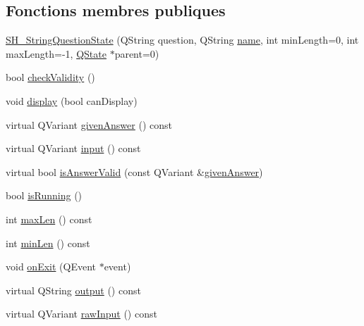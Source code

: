 \subsection*{Fonctions membres publiques}
\begin{DoxyCompactItemize}
\item 
\hyperlink{classSimpleHotel_1_1SH__StringQuestionState_a9c0279dfa4d5839719a3c0380d126f84}{S\-H\-\_\-\-String\-Question\-State} (Q\-String question, Q\-String \hyperlink{classSimpleHotel_1_1SH__NamedObject_ad144716345034c91cface8f3163a799e}{name}, int min\-Length=0, int max\-Length=-\/1, \hyperlink{classQState}{Q\-State} $\ast$parent=0)
\item 
bool \hyperlink{classSimpleHotel_1_1SH__QuestionState_a0fd7e76443cfd6f0329b085358e30355}{check\-Validity} ()
\item 
void \hyperlink{classSimpleHotel_1_1SH__InOutState_a1cbe5befe4f42e0941165498ed0117a9}{display} (bool can\-Display)
\item 
virtual Q\-Variant \hyperlink{classSimpleHotel_1_1SH__QuestionState_a243f09bc1f822af7748edb038ac2957c}{given\-Answer} () const 
\item 
virtual Q\-Variant \hyperlink{classSimpleHotel_1_1SH__InOutState_a487d2ca6200fed372b1a27cfa27774db}{input} () const 
\item 
virtual bool \hyperlink{classSimpleHotel_1_1SH__StringQuestionState_a64428aab057a96918f2f97815c7c2717}{is\-Answer\-Valid} (const Q\-Variant \&\hyperlink{classSimpleHotel_1_1SH__QuestionState_a243f09bc1f822af7748edb038ac2957c}{given\-Answer})
\item 
bool \hyperlink{classSimpleHotel_1_1SH__GenericState_a5151ff071129bdd4dcf7c60cb93794da}{is\-Running} ()
\item 
int \hyperlink{classSimpleHotel_1_1SH__StringQuestionState_a0e6c288a9af0b8d48238b24a07021457}{max\-Len} () const 
\item 
int \hyperlink{classSimpleHotel_1_1SH__StringQuestionState_abe581cfd2fc9591effad3f07b33544a1}{min\-Len} () const 
\item 
void \hyperlink{classSimpleHotel_1_1SH__InOutState_aa5fc1b9281087bd8abcd6873d2a36009}{on\-Exit} (Q\-Event $\ast$event)
\item 
virtual Q\-String \hyperlink{classSimpleHotel_1_1SH__InOutState_a71b15e4d49b9c2aa540500065ceb39da}{output} () const 
\item 
virtual Q\-Variant \hyperlink{classSimpleHotel_1_1SH__InOutState_a5e8064672e20c7b13fec67a4955a3ce3}{raw\-Input} () const 
\item 

\end{DoxyCompactItemize}
